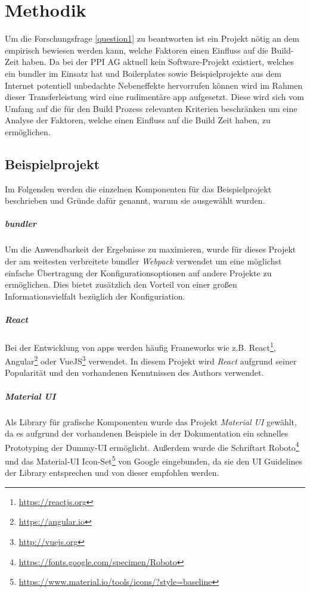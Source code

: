\documentclass[11pt]{report}
\begin{document}
	\chapter{Methodik}
		Um die Forschungsfrage \ref{question1} zu beantworten ist ein Projekt nötig an dem empirisch bewiesen werden kann, welche Faktoren einen Einfluss auf die Build-Zeit haben. Da bei der PPI AG aktuell kein Software-Projekt existiert, welches ein \Gls{bundler} im Einsatz hat und Boilerplates sowie Beispielprojekte aus dem Internet potentiell unbedachte Nebeneffekte hervorrufen können wird im Rahmen dieser Transferleistung wird eine rudimentäre \Gls{app} aufgesetzt. Diese wird sich vom Umfang auf die für den Build Prozess relevanten Kriterien beschränken um eine Analyse der Faktoren, welche einen Einfluss auf die Build Zeit haben, zu ermöglichen.
		\section{Beispielprojekt}
			Im Folgenden werden die einzelnen Komponenten für das Beispielprojekt beschrieben und Gründe dafür genannt, warum sie ausgewählt wurden.
			\paragraph{\Gls{bundler}} Um die Anwendbarkeit der Ergebnisse zu maximieren, wurde für dieses Projekt der am weitesten verbreitete \Gls{bundler} \emph{Webpack}\cite{npmtrends:wab} verwendet um eine möglichst einfache Übertragung der Konfigurationsoptionen auf andere Projekte zu ermöglichen. Dies bietet zusätzlich den Vorteil von einer großen Informationsvielfalt bezüglich der Konfiguriation.

			\paragraph{React} Bei der Entwicklung von \Glspl{app} werden häufig Frameworks wie z.B. React\footnote{\url{https://reactjs.org}}, Angular\footnote{\url{https://angular.io}} oder VueJS\footnote{\url{http://vuejs.org}} verwendet. In diesem Projekt wird \emph{React} aufgrund seiner Popularität\cite{npmtrends:frameworks} und den vorhandenen Kenntnissen des Authors verwendet.

			\paragraph{Material UI} Als Library für grafische Komponenten wurde das Projekt \emph{Material UI}\cite{frameworks:material-ui} gewählt, da es aufgrund der vorhandenen Beispiele in der Dokumentation ein schnelles Prototyping der Dummy-UI ermöglicht. Außerdem wurde die Schriftart Roboto\footnote{\url{https://fonts.google.com/specimen/Roboto}} und das Material-UI Icon-Set\footnote{\url{https://www.material.io/tools/icons/?style=baseline}} von Google eingebunden, da sie den UI Guidelines\cite{guidelines:material-ui} der Library entsprechen und von dieser empfohlen werden.
\end{document}
